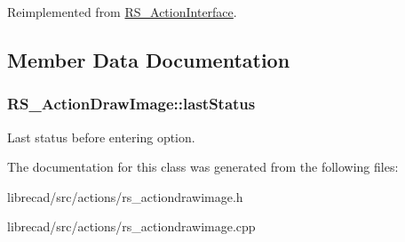 Reimplemented from \hyperlink{classRS__ActionInterface_af1a8d898a8bf0521295d7c45d80e6d09}{R\-S\-\_\-\-Action\-Interface}.



\subsection{Member Data Documentation}
\hypertarget{classRS__ActionDrawImage_a204732dc8fa419a32c597341728889ff}{
\subsubsection[{last\-Status}]{ R\-S\-\_\-\-Action\-Draw\-Image\-::last\-Status\hspace{0.3cm}{\ttfamily [protected]}}}\label{classRS__ActionDrawImage_a204732dc8fa419a32c597341728889ff}
Last status before entering option. 

The documentation for this class was generated from the following files\-:\begin{DoxyCompactItemize}
\item 
librecad/src/actions/rs\-\_\-actiondrawimage.\-h\item 
librecad/src/actions/rs\-\_\-actiondrawimage.\-cpp\end{DoxyCompactItemize}
